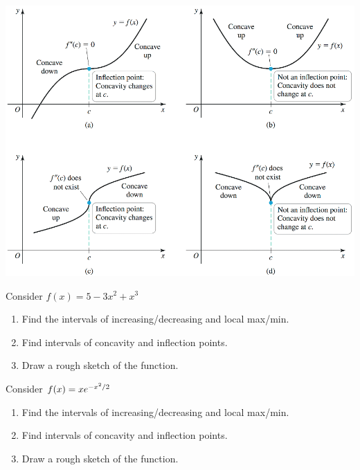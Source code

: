 \documentclass[mathNotesPreamble]{subfiles}
\begin{document}
\begin{center}
  \includegraphics[width=0.925\linewidth]{images/briggs_04_03/fig4_35.png}
\end{center}
\pagebreak

\noindent
{}
\begin{ex*}
  Consider $f(x)=5-3x^2+x^3$
\end{ex*}
\begin{enumerate}[itemsep=\stretch{1}, label=\alph*)]
  \item Find the intervals of increasing/decreasing and local max/min.
  \item Find intervals of concavity and inflection points.
  \item Draw a rough sketch of the function.
\end{enumerate}
\pagebreak

\begin{ex*}
  Consider $f(x)=xe\inv[x^2/2]$
\end{ex*}
\begin{enumerate}[itemsep=\stretch{1}, label=\alph*)]
  \item Find the intervals of increasing/decreasing and local max/min.
  \item Find intervals of concavity and inflection points.
  \item Draw a rough sketch of the function.
\end{enumerate}
\pagebreak
\end{document}
